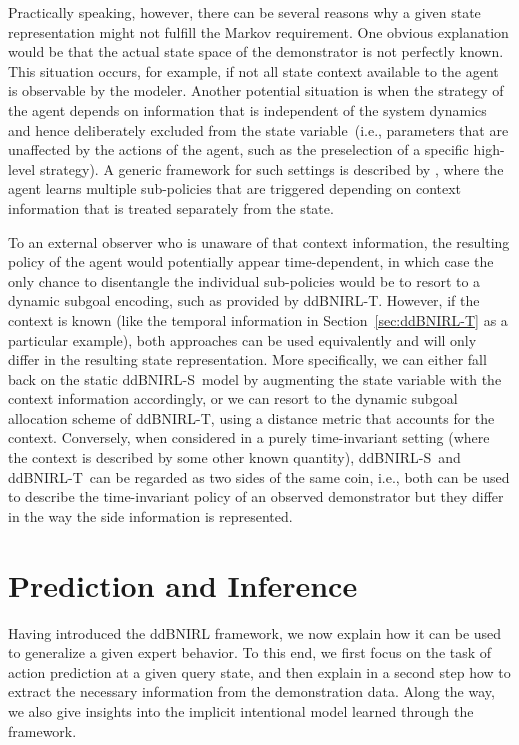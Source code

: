 \documentclass[twoside,11pt]{article}
\newcommand{\ie}{i.e.}
\newcommand{\ddBNIRLS}{\mbox{ddBNIRL-S}}
\newcommand{\ddBNIRLT}{\mbox{ddBNIRL-T}}
\begin{document}
Practically speaking, 
however, there can %
be several reasons why a given state representation might not fulfill the Markov requirement. One obvious explanation would be that the actual state space of the demonstrator is not perfectly known. This situation occurs, for example, if not all state context %
available to the agent is observable by the modeler. Another potential situation is when the strategy of the agent %
depends on information that is %
%
independent of the system dynamics and hence deliberately excluded from the state variable~(\ie, parameters that are unaffected by the actions of the agent, such as the preselection of a specific high-level strategy). %
%
A generic framework for such settings is described by \citet{daniel2016hierarchical}, where the agent learns multiple sub-policies %
that are triggered depending on %
context information that is 
treated separately from the state.

To an external observer who is unaware of that context information, the resulting policy of the agent would potentially appear time-dependent, %
in which case the only chance to disentangle the individual sub-policies %
would be to resort to a dynamic subgoal encoding, such as provided by \ddBNIRLT. 
%
%
%
%
%
%
However, if the %
context is known (like the temporal information in Section~\ref{sec:ddBNIRL-T} as a particular example), %
%
both approaches can be used equivalently and %
will only differ in the resulting state representation. More specifically, %
we can either fall back on the static \ddBNIRLS\ model by augmenting the state variable with the context information accordingly, or we can resort to the dynamic subgoal allocation scheme of \ddBNIRLT, using a distance metric that %
accounts for %
the context.
Conversely, when considered in a purely time-invariant setting (where the context is described by some other known quantity), 
\ddBNIRLS\ and \ddBNIRLT\ can be regarded as two sides of the same coin, \ie, both can be used to describe the time-invariant policy of an observed demonstrator but they differ %
%
in the way the side information %
is represented.





\section{Prediction and Inference}
\label{sec:predAndInf}
Having introduced the ddBNIRL framework,
%
we now explain how it can be used to %
%
%
%
generalize a given
expert %
behavior. To this end, we first focus on the %
task of %
action prediction at a given query state, and then explain in a second step how to %
extract the necessary %
information from the %
demonstration data. Along the way, we also give insights into the implicit intentional model learned %
through the framework.
%
%
%
%
\end{document}
